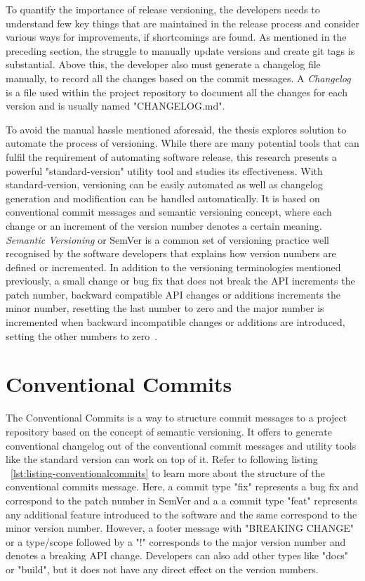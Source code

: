 To quantify the importance of release versioning, the developers needs to understand few key things that are maintained in the release process and consider various ways for improvements, if shortcomings are found. As mentioned in the preceding section, the struggle to manually update versions and create git tags is substantial. Above this, the developer also must generate a changelog file manually, to record all the changes based on the commit messages. A \emph{Changelog} is a file used within the project repository to document all the changes for each version and is usually named "CHANGELOG.md". 

To avoid the manual hassle mentioned aforesaid, the thesis explores solution to automate the process of versioning. While there are many potential tools that can fulfil the requirement of automating software release, this research presents a powerful "standard-version" utility tool and studies its effectiveness. With standard-version, versioning can be easily automated as well as changelog generation and modification can be handled automatically. It is based on conventional commit messages and semantic versioning concept, where each change or an increment of the version number denotes a certain meaning. \emph{Semantic Versioning} or \ac{SemVer} is a common set of versioning practice well recognised by the software developers that explains how version numbers are defined or incremented. In addition to the versioning terminologies mentioned previously, a small change or bug fix that does not break the \ac{API} increments the patch number, backward compatible \ac{API} changes or additions increments the minor number, resetting the last number to zero and the major number is incremented when backward incompatible changes or additions are introduced, setting the other numbers to zero~\parencite{preston2013semantic}.

\section{Conventional Commits} 

The Conventional Commits is a way to structure commit messages to a project repository based on the concept of semantic versioning. It offers to generate conventional changelog out of the conventional commit messages and utility tools like the standard version can work on top of it. Refer to following listing ~\ref{lst:listing-conventionalcommits} to learn more about the structure of the conventional commits message. Here, a commit type "fix" represents a bug fix and correspond to the patch number in \ac{SemVer} and a a commit type "feat" represents any additional feature introduced to the software and the same correspond to the minor version number. However, a footer message with "BREAKING CHANGE" or a type/scope followed by a "!" corresponds to the major version number and denotes a breaking API change. Developers can also add other types like "docs" or "build", but it does not have any direct effect on the version numbers. 


